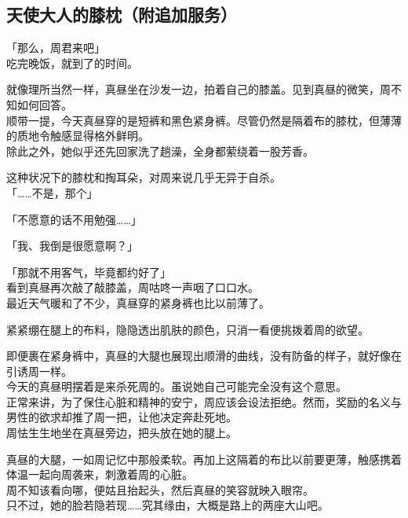\subsection{天使大人的膝枕（附追加服务）}

「那么，周君来吧」\\

吃完晚饭，就到了的时间。

就像理所当然一样，真昼坐在沙发一边，拍着自己的膝盖。见到真昼的微笑，周不知如何回答。\\

顺带一提，今天真昼穿的是短裤和黑色紧身裤。尽管仍然是隔着布的膝枕，但薄薄的质地令触感显得格外鲜明。\\

除此之外，她似乎还先回家洗了趟澡，全身都萦绕着一股芳香。

这种状况下的膝枕和掏耳朵，对周来说几乎无异于自杀。\\

「……不是，那个」

「不愿意的话不用勉强……」

「我、我倒是很愿意啊？」

「那就不用客气，毕竟都约好了」\\

看到真昼再次敲了敲膝盖，周咕咚一声咽了口口水。\\

最近天气暖和了不少，真昼穿的紧身裤也比以前薄了。

紧紧绷在腿上的布料，隐隐透出肌肤的颜色，只消一看便挑拨着周的欲望。

即便裹在紧身裤中，真昼的大腿也展现出顺滑的曲线，没有防备的样子，就好像在引诱周一样。\\

今天的真昼明摆着是来杀死周的。虽说她自己可能完全没有这个意思。\\

正常来讲，为了保住心脏和精神的安宁，周应该会设法拒绝。然而，奖励的名义与男性的欲求却推了周一把，让他决定奔赴死地。\\

周怯生生地坐在真昼旁边，把头放在她的腿上。

真昼的大腿，一如周记忆中那般柔软。再加上这隔着的布比以前要更薄，触感携着体温一起向周袭来，刺激着周的心脏。\\

周不知该看向哪，便姑且抬起头，然后真昼的笑容就映入眼帘。\\

只不过，她的脸若隐若现……究其缘由，大概是路上的两座大山吧。\\

